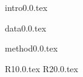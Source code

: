 \documentclass[useAMS,usenatbib]{mn2e}
\begin{document}
{intro0.0.tex}

{data0.0.tex}


{method0.0.tex}

{R10.0.tex}
{R20.0.tex}
\end{document}

